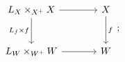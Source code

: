 \[
\begin{tikzcd}[column sep=large,row sep=large]
  L_X\times_{X^+}X
    \arrow[r]
    \arrow[d,"L_f\times f"']
  &
  X
    \arrow[d,"f"]
  \\
  L_W\times_{W^+}W
    \arrow[r]
  &
  W
\end{tikzcd}
\,;
\]

